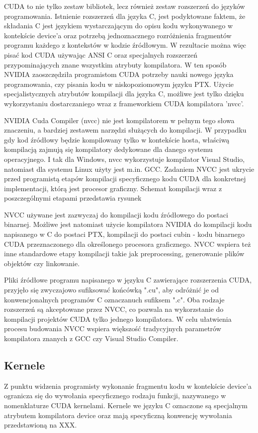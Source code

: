 CUDA to nie tylko zestaw bibliotek, lecz również zestaw rozszerzeń do języków
programowania. Istnienie rozszerzeń dla języka C, jest
podyktowane faktem, że składania C jest językiem wystarczającym do opisu kodu
wykonywanego w kontekście device'a oraz potrzebą jednoznacznego rozróżnienia
fragmentów programu każdego z kontekstów w kodzie źródłowym. W rezultacie
można więc pisać kod CUDA używając ANSI C oraz specjalnych rozszerzeń
przypominających znane wszystkim atrybuty kompilatora. W ten sposób NVIDIA
zaoszczędziła programistom CUDA potrzeby nauki nowego języka programowania, czy
pisania kodu w niskopoziomowym języku PTX. Użycie specjalistycznych atrybutów
kompilacji dla języka C, możliwe jest tylko dzięku wykorzystaniu dostarczaniego wraz z
frameworkiem CUDA kompilatora 'nvcc'.

NVIDIA Cuda Compiler (nvcc) nie jest kompilatorem w pełnym tego słowa
znaczeniu, a bardziej zestawem narzędzi służących do kompilacji. W przypadku gdy
kod źródłowy będzie kompilowany tylko w kontekście hosta, właściwą kompilacją
zajmują się kompilatory dedykowane dla danego systemu operacyjnego. I tak dla
Windows, nvcc wykorzystuje kompilator Visual Studio, natomiast dla systemu Linux
użyty jest m.in. GCC. Zadaniem NVCC jest ukrycie przed programistą etapów kompilacji
specyficznego kodu CUDA dla konkretnej implementacji, którą jest procesor
graficzny. Schemat kompilacji wraz z poszczególnymi etapami przedstawia rysunek

NVCC używane jest zazwyczaj do kompilacji kodu źródłowego do postaci binarnej.
Możliwe jest natomiast użycie kompilatora NVIDIA do kompilacji kodu napisanego w
C do postaci PTX, kompilacji do postaci cubin - kodu binarnego CUDA
przeznaczonego dla określonego procesora graficznego. NVCC wspiera też inne
standardowe etapy kompilacji takie jak preprocessing, generowanie plików
objektów czy linkowanie.

Pliki źródłowe programu napisanego w języku C zawierające rozszerzenia CUDA, przyjęło się zwyczajowo
sufiksować końcówką ".cu", aby odróżnić je od konwencjonalnych programów C
oznaczanuch sufiksem ".c". Oba rodzaje rozszerzeń są akceptowane przez NVCC, co
pozwala na wykorzstanie do kompilacji projektów CUDA tylko jednego kompilatora.
W celu ułatwienia procesu budowania NVCC wspiera większość tradycyjnych
parametrów kompilatora znanych z GCC czy Visual Studio Compiler. 

\subsection{Kernele}
Z punktu widzenia programisty wykonanie fragmentu kodu w kontekście device'a
ogranicza się do wywołania specyficznego rodzaju funkcji, nazywanego w nomenklaturze CUDA kernelami.
Kernele we języku C oznaczone są specjalnym atrybutem kompilatora device oraz mają
specyficzną konwencję wywołania przedstawioną na XXX.

